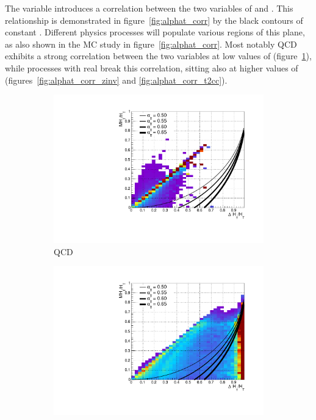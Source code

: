 The \alphat variable introduces a correlation between the two variables of \mht
and \deltaHT. This relationship is demonstrated in figure~\ref{fig:alphat_corr}
by the black contours of constant \alphat. Different physics processes
will populate various regions of this plane, as also shown in the MC study in
figure~\ref{fig:alphat_corr}. Most notably QCD exhibits a strong
correlation between the two variables at low values of \alphat
(figure~\ref{fig:alphat_corr_qcd}), while processes with real \met break this
correlation, sitting also at higher values of \alphat
(figures~\ref{fig:alphat_corr_zinv} and \ref{fig:alphat_corr_t2cc}).

\begin{figure}[t!]
  \centering
  \begin{subfigure}[t]{.46\textwidth}
    \includegraphics[width=\textwidth]{Figs/alphat/alphat_correlation_QCD.pdf}
    \caption{QCD}
    \label{fig:alphat_corr_qcd}
  \end{subfigure}
  \begin{subfigure}[t]{.46\textwidth}
    \includegraphics[width=\textwidth]{Figs/alphat/alphat_correlation_Zinv.pdf}

\end{subfigure}
\end{figure}
